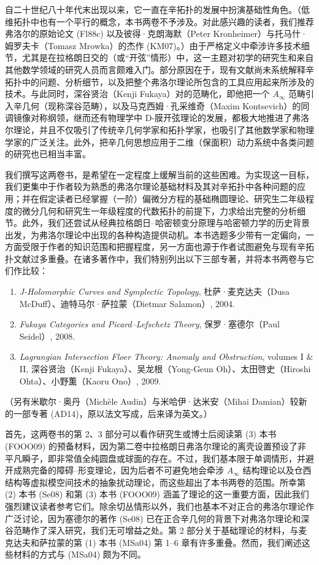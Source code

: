 自二十世纪八十年代末\termFloerHomology{}出现以来，它一直在辛拓扑的发展中扮演基础性角色。（低维拓扑中也有一个平行的概念，本书两卷不予涉及。对此感兴趣的读者，我们推荐弗洛尔的原始论文 (Fl88c) 以及彼得·克朗海默（Peter Kronheimer）与托马什·姆罗夫卡（Tomasz Mrowka）的杰作 (KM07)。）由于严格定义中牵涉许多技术细节，尤其是在拉格朗日交的\termFloerHomology（或“开弦”情形）中，这一主题对初学的研究生和来自其他数学领域的研究人员而言颇难入门。部分原因在于，现有文献尚未系统解释辛拓扑中的问题、分析细节，以及把整个弗洛尔理论所包含的工具应用起来所涉及的技术。与此同时，深谷贤治（Kenji Fukaya）对\termFloerHomology{}的范畴化，即他把一个 $A_\infty$ 范畴引入辛几何（现称深谷范畴），以及马克西姆·孔采维奇（Maxim Kontsevich）的同调镜像对称纲领，继而还有物理学中 D-膜开弦理论的发展，都极大地推进了弗洛尔理论，并且不仅吸引了传统辛几何学家和拓扑学家，也吸引了其他数学家和物理学家的广泛关注。此外，把辛几何思想应用于二维（保面积）动力系统中各类问题的研究也已相当丰富。

我们撰写这两卷书，是希望在一定程度上缓解当前的这些困难。为实现这一目标，我们更集中于作者较为熟悉的弗洛尔理论基础材料及其对辛拓扑中各种问题的应用；并在假定读者已经掌握（一阶）偏微分方程的基础椭圆理论、研究生二年级程度的微分几何和研究生一年级程度的代数拓扑的前提下，力求给出完整的分析细节。此外，我们还尝试从经典拉格朗日--哈密顿变分原理与哈密顿力学的历史背景出发，为弗洛尔理论中出现的各种构造提供动机。本书选题多少带有一定偏向，一方面受限于作者的知识范围和把握程度，另一方面也源于作者试图避免与现有辛拓扑文献过多重叠。在诸多著作中，我们特别列出以下三部专著，并将本书两卷与它们作比较：

\begin{enumerate}[label=(\arabic*)]
  \item \emph{J-Holomorphic Curves and Symplectic Topology}, 杜萨·麦克达夫（Dusa McDuff）、迪特马尔·萨拉蒙（Dietmar Salamon）, 2004.
  \item \emph{Fukaya Categories and Picard--Lefschetz Theory}, 保罗·塞德尔（Paul Seidel）, 2008.
  \item \emph{Lagrangian Intersection Floer Theory: Anomaly and Obstruction}, volumes I \& II, 深谷贤治（Kenji Fukaya）、吴龙根（Yong-Geun Oh）、太田啓史（Hiroshi Ohta）、小野薫（Kaoru Ono）, 2009.
\end{enumerate}

（另有米歇尔·奥丹（Michèle Audin）与米哈伊·达米安（Mihai Damian）较新的一部专著 (AD14)，原以法文写成，后来译为英文。）

首先，这两卷书的第 2、3 部分可以看作研究生或博士后阅读第 (3) 本书 (FOOO09) 的预备材料，因为第二卷中拉格朗日弗洛尔理论的离壳设置预设了非平凡瞬子，即非常值全纯圆盘或球面的存在。不过，我们基本限于单调情形，并避开成熟完备的\termFloerHomology{}障碍--形变理论，因为后者不可避免地会牵涉 $A_\infty$ 结构理论以及仓西结构等虚拟模空间技术的抽象扰动理论，而这些超出了本书两卷的范围。所幸第 (2) 本书 (Se08) 和第 (3) 本书 (FOOO09) 涵盖了理论的这一重要方面，因此我们强烈建议读者参考它们。除余切丛情形以外，我们也基本不对正合\termLagrangianSubmanifold{}的弗洛尔理论作广泛讨论，因为塞德尔的著作 (Se08) 已在正合辛几何的背景下对弗洛尔理论和深谷范畴作了深入研究，我们无可增益之处。第 2 部分关于基础\termPseudoholomorphicCurve{}理论的材料，与麦克达夫和萨拉蒙的第 (1) 本书 (MSa04) 第 1--6 章有许多重叠。然而，我们阐述这些材料的方式与 (MSa04) 颇为不同。

